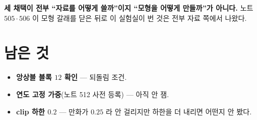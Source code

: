 \documentclass[11pt]{article}
\begin{document}
\textbf{세 채택이 전부 ``자료를 어떻게 쓸까''이지 ``모형을 어떻게 만들까''가
아니다.} 노트 $505 \cdot 506$ 이 모형 갈래를 닫은 뒤로 이 실험실이 번 것은
전부 자료 쪽에서 나왔다.

\section*{남은 것}

\begin{itemize}
\item \textbf{앙상블 블록 $12$ 확인} --- 되돌림 조건.
\item \textbf{연도 고정 가중}(노트 512 사전 등록) --- 아직 안 잼.
\item \textbf{clip 하한 $0.2$} --- 만화가 $0.25$ 라 안 걸리지만 하한을
더 내리면 어떤지 안 봤다.
\end{itemize}
\end{document}
